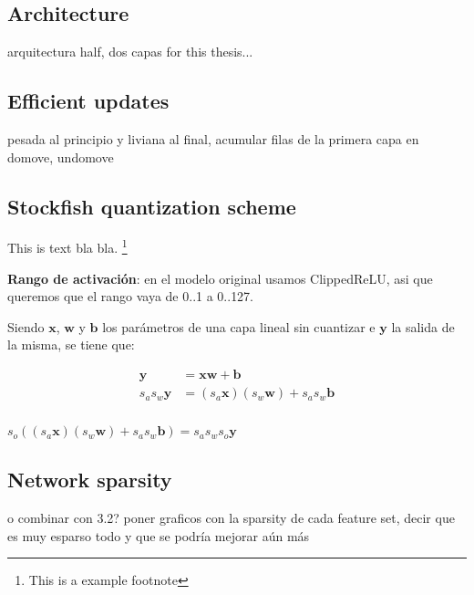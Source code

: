 \subsection{Architecture}


arquitectura half, dos capas
for this thesis...


\subsection{Efficient updates}

pesada al principio y liviana al final, acumular filas de la primera capa en domove, undomove

\subsection{Stockfish quantization scheme}



This is text bla bla. \footnote[2]{This is a example footnote}



\textbf{Rango de activación}: en el modelo original usamos ClippedReLU, asi que queremos que el rango vaya de 0..1 a 0..127.


Siendo $\bm{x}$, $\bm{w}$ y $\bm{b}$ los parámetros de una capa lineal sin cuantizar e $\bm{y}$ la salida de la misma, se tiene que:

\begin{equation}
\begin{aligned}
\bm{y} &= \bm{x} \bm{w} + \bm{b} \\
s_a s_w \bm{y} &= (s_a \bm{x}) (s_w \bm{w}) + s_a s_w \bm{b} \\
\end{aligned}
\end{equation}



\vspace{1cm}
$s_o ((s_a \bm{x}) (s_w \bm{w}) + s_a s_w \bm{b}) = s_a s_w s_o \bm{y}$



\subsection{Network sparsity}

o combinar con 3.2?
poner graficos con la sparsity de cada feature set, decir que es muy esparso todo y que se podría mejorar aún más
